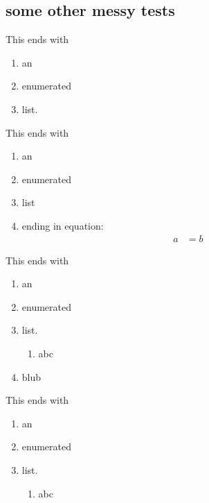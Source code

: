 \documentclass[leqno]{article}
\begin{document}
\subsection{some other messy tests}

\begin{theorem}
  This ends with
  \begin{enumerate}
  \item an
  \item enumerated
  \item list.
  \end{enumerate}
\end{theorem}

\begin{theorem}
  This ends with
  \begin{enumerate}
  \item an
  \item enumerated
  \item list
  \item ending in equation:
  \begin{align*}
  a&=b
  \end{align*}
  \end{enumerate}
\end{theorem}

\begin{theorem}
  This ends with
  \begin{enumerate}
  \item an
  \item enumerated
  \item list.
  \begin{enumerate}
  \item abc
  \end{enumerate}
  \item blub
  \end{enumerate}
\end{theorem}

\begin{theorem}
  This ends with
  \begin{enumerate}
  \item an
  \item enumerated
  \item list.
  \begin{enumerate}
  \item abc
  \end{enumerate}
  \end{enumerate}
\end{theorem}
\end{document}
